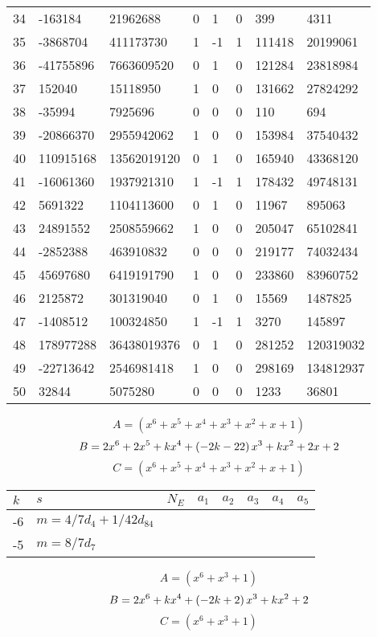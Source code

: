 \documentclass{amsart}
\begin{document}
\begin{longtable}{|l|l|l|lllll|}
34&-163184&21962688&0&1&0&399&4311\\
35&-3868704&411173730&1&-1&1&111418&20199061\\
36&-41755896&7663609520&0&1&0&121284&23818984\\
37&152040&15118950&1&0&0&131662&27824292\\
38&-35994&7925696&0&0&0&110&694\\
39&-20866370&2955942062&1&0&0&153984&37540432\\
40&110915168&13562019120&0&1&0&165940&43368120\\
41&-16061360&1937921310&1&-1&1&178432&49748131\\
42&5691322&1104113600&0&1&0&11967&895063\\
43&24891552&2508559662&1&0&0&205047&65102841\\
44&-2852388&463910832&0&0&0&219177&74032434\\
45&45697680&6419191790&1&0&0&233860&83960752\\
46&2125872&301319040&0&1&0&15569&1487825\\
47&-1408512&100324850&1&-1&1&3270&145897\\
48&178977288&36438019376&0&1&0&281252&120319032\\
49&-22713642&2546981418&1&0&0&298169&134812937\\
50&32844&5075280&0&0&0&1233&36801\\
\hline
\end{longtable}
$$A=(x^6
 + x^5
 + x^4
 + x^3
 + x^2
 + x
 + 1)$$
$$B=2\*x^6
 + 2\*x^5
 + k\*x^4
 + \left(-2\*k
 - 22\right) \*x^3
 + k\*x^2
 + 2\*x
 + 2$$
$$C=(x^6
 + x^5
 + x^4
 + x^3
 + x^2
 + x
 + 1)$$
\begin{longtable}{|l|l|l|lllll|}
\hline
$k$ & $s$ & $N_E$ & $a_1$ & $a_2$ & $a_3$ & $a_4$ & $a_5$\\
\hline
-6&$m=4/7d_{4}+1/42d_{84}$&&\multicolumn{5}{c|}{}\\
-5&$m=8/7d_{7}$&&\multicolumn{5}{c|}{}\\
\hline
\end{longtable}
$$A=(x^6
 + x^3
 + 1)$$
$$B=2\*x^6
 + k\*x^4
 + \left(-2\*k
 + 2\right) \*x^3
 + k\*x^2
 + 2$$
$$C=(x^6
 + x^3
 + 1)$$
\end{document}

